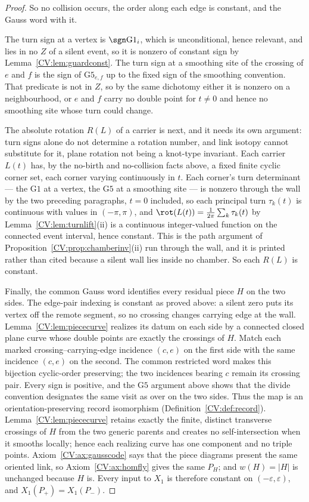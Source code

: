 \begin{proof}
So no collision occurs, the order along each edge is constant, and the Gauss
word with it.

The turn sign at a vertex is $\sgn\mathrm{G1}_i$, which is unconditional,
hence relevant, and lies in no $Z$ of a silent event, so it is nonzero of
constant sign by Lemma~\ref{CV:lem:guardconst}. The
turn sign at a smoothing site of the crossing of $e$ and $f$ is the sign of
$\mathrm{G5}_{e,f}$ up to the fixed sign of the smoothing convention. That
predicate is not in $Z$, so by the same dichotomy either it is nonzero on a
neighbourhood, or $e$ and $f$ carry no double point for $t\neq0$ and hence no
smoothing site whose turn could change.

The absolute rotation $R(L)$ of a carrier is next, and it needs its own
argument: turn signs alone do not determine a rotation number, and link
isotopy cannot substitute for it, plane rotation not being a knot-type
invariant. Each carrier $L(t)$ has, by the no-birth and no-collision facts
above, a fixed finite cyclic corner set, each corner varying continuously in
$t$. Each corner's turn determinant --- the $\mathrm{G1}$ at a vertex, the
$\mathrm{G5}$ at a smoothing site --- is nonzero through the wall by the two
preceding paragraphs, $t=0$ included, so each principal turn $\tau_k(t)$ is
continuous with values in $(-\pi,\pi)$, and
$\rot(L(t))=\frac1{2\pi}\sum_k\tau_k(t)$ by Lemma~\ref{CV:lem:turnlift}(ii) is a
continuous integer-valued function on the connected event interval, hence
constant. This is the path argument of Proposition~\ref{CV:prop:chamberinv}(ii) run
through the wall, and it is printed rather than cited because a silent wall
lies inside no chamber. So each $R(L)$ is constant.

Finally, the common Gauss word identifies every residual piece $H$ on the two
sides. The edge-pair indexing is constant as proved above: a silent zero puts its vertex
off the remote segment, so no crossing changes carrying edge at the wall.
Lemma~\ref{CV:lem:piececurve} realizes its datum on each side by a connected
closed plane curve whose double points are exactly the crossings of $H$. Match each marked crossing--carrying-edge
incidence $(c,e)$ on the first side with the same incidence $(c,e)$
on the second. The common restricted word makes this bijection cyclic-order
preserving; the two incidences bearing $c$ remain its crossing pair. Every sign
is positive, and the $\mathrm{G5}$ argument above shows that the divide
convention designates the same visit as over on the two sides. Thus the map is
an orientation-preserving record isomorphism
(Definition~\ref{CV:def:record}). Lemma~\ref{CV:lem:piececurve} retains exactly
the finite, distinct transverse crossings of $H$ from the two generic parents
and creates no self-intersection when it smooths locally; hence each realizing
curve has one component and no triple points. Axiom~\ref{CV:ax:gausscode} says that the piece diagrams present the same
oriented link, so Axiom~\ref{CV:ax:homfly} gives the same $P_H$; and
$w(H)=|H|$ is unchanged because $H$ is.
Every input to $X_1$ is therefore constant on $(-\varepsilon,\varepsilon)$, and
$X_1(P_+)=X_1(P_-)$.
\end{proof}

